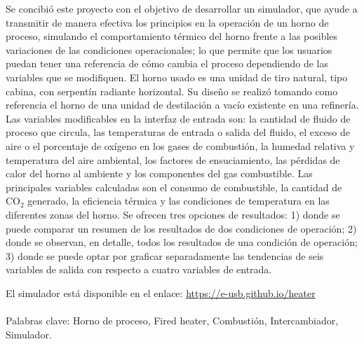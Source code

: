 \documentclass[pregrado]{tesis-usb}
\begin{document}
\frontmatter
\maketitle


\begin{resumen}
    \par Se concibió este proyecto con el objetivo de desarrollar un simulador, que ayude a transmitir de manera efectiva los principios en la operación de un horno de proceso, simulando el comportamiento térmico del horno frente a las posibles variaciones de las condiciones operacionales; lo que permite que los usuarios puedan tener una referencia de cómo cambia el proceso dependiendo de las variables que se modifiquen.
    El horno usado es una unidad de tiro natural, tipo cabina, con serpentín radiante horizontal. Su diseño se realizó tomando como referencia el horno de una unidad de destilación a vacío existente en una refinería.
    Las variables modificables en la interfaz de entrada son: la cantidad de fluido de proceso que circula, las temperaturas de entrada o salida del fluido, el exceso de aire o el porcentaje de oxígeno en los gases de combustión, la humedad relativa y temperatura del aire ambiental, los factores de ensuciamiento, las pérdidas de calor del horno al ambiente y los componentes del gas combustible. Las principales variables calculadas son el consumo de combustible, la cantidad de CO$_2$ generado, la eficiencia térmica y las condiciones de temperatura en las diferentes zonas del horno.
    Se ofrecen tres opciones de resultados: 1) donde se puede comparar un resumen de los resultados de dos condiciones de operación; 2) donde se observan, en detalle, todos los resultados de una condición de operación; 3) donde se puede optar por graficar separadamente las tendencias de seis variables de salida con respecto a cuatro variables de entrada.\\
    \par El simulador está disponible en el enlace: \url{https://e-usb.github.io/heater}\\
     \vspace{10pt}\\
     Palabras clave: Horno de proceso, Fired heater, Combustión, Intercambiador, Simulador.
\end{resumen}
\tableofcontents
\listoffigures
\listoftables
\useacronyms


\setlength{\parskip}{6px}
\mainmatter









\nocite{*}

\appendix



\end{document}
